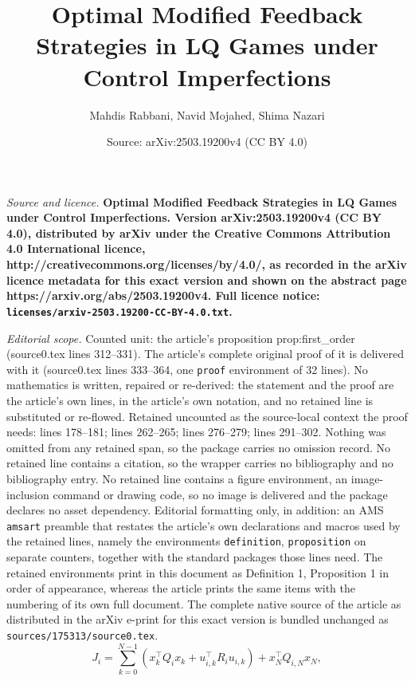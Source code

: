 \documentclass[10pt,a4paper]{amsart}
\title{\LARGE \bf Optimal Modified Feedback Strategies in LQ Games under Control Imperfections}
\author{Mahdis Rabbani, Navid Mojahed, Shima Nazari}
\date{Source: arXiv:2503.19200v4 (CC BY 4.0)}
\begin{document}
\maketitle

\noindent\emph{Source and licence.} \LARGE \bf Optimal Modified Feedback Strategies in LQ Games under Control Imperfections. Version arXiv:2503.19200v4 (CC BY 4.0), distributed by arXiv under the Creative Commons Attribution 4.0 International licence, http://creativecommons.org/licenses/by/4.0/, as recorded in the arXiv licence metadata for this exact version and shown on the abstract page https://arxiv.org/abs/2503.19200v4. Full licence notice: \texttt{licenses/arxiv-2503.19200-CC-BY-4.0.txt}.\par\smallskip

\noindent\textit{Editorial scope.} Counted unit: the article's proposition prop:first\_order (source0.tex lines 312--331). The article's complete original proof of it is delivered with it (source0.tex lines 333--364, one \texttt{proof} environment of 32 lines). No mathematics is written, repaired or re-derived: the statement and the proof are the article's own lines, in the article's own notation, and no retained line is substituted or re-flowed.  Retained uncounted as the source-local context the proof needs: lines 178--181; lines 262--265; lines 276--279; lines 291--302.  Nothing was omitted from any retained span, so the package carries no omission record.  No retained line contains a citation, so the wrapper carries no bibliography and no bibliography entry.  No retained line contains a figure environment, an image-inclusion command or drawing code, so no image is delivered and the package declares no asset dependency.  Editorial formatting only, in addition: an AMS \texttt{amsart} preamble that restates the article's own declarations and macros used by the retained lines, namely the environments \texttt{definition}, \texttt{proposition} on separate counters, together with the standard packages those lines need.  The retained environments print in this document as Definition 1, Proposition 1 in order of appearance, whereas the article prints the same items with the numbering of its own full document.  The complete native source of the article as distributed in the arXiv e-print for this exact version is bundled unchanged as \texttt{sources/175313/source0.tex}.
\begin{equation}
    \label{eq:LQ cost function}
    J_i = \sum_{k=0}^{N-1} \left( x_k^\top Q_i x_k + u_{i,k}^\top R_i u_{i,k} \right) + x_N^\top Q_{i,N} x_N,
\end{equation}
\end{document}
